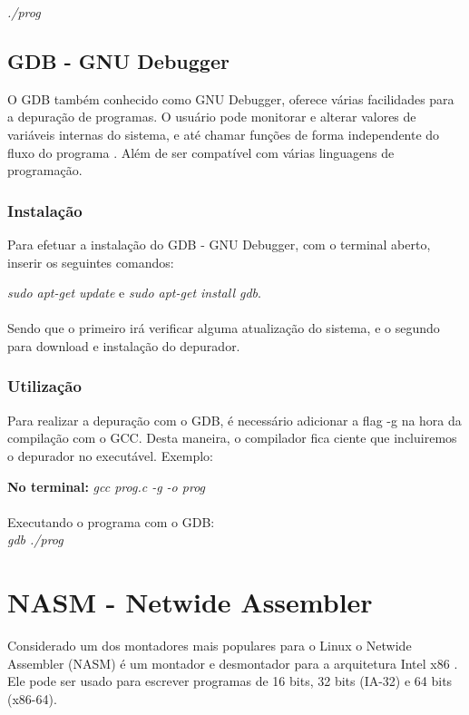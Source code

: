 \documentclass[12pt]{article}
\begin{document}
\textit{./prog}

\subsection{GDB - GNU Debugger}

O GDB também conhecido como GNU Debugger, oferece várias facilidades para a depuração de programas. O usuário pode monitorar e alterar valores de variáveis internas do sistema, e até chamar funções de forma independente do fluxo do programa \cite{stallman1988debugging}. Além de ser compatível com várias linguagens de programação.

\subsubsection{Instalação}

Para efetuar a instalação do GDB - GNU Debugger, com o terminal aberto, inserir os seguintes comandos:

\textit{sudo apt-get update} e \textit{sudo apt-get install gdb}.\\\\ 
Sendo que o primeiro irá verificar alguma atualização do sistema, e o segundo para download e instalação do depurador.

\subsubsection{Utilização}

Para realizar a depuração com o GDB, é necessário adicionar a flag -g na hora da compilação com o GCC. Desta maneira, o compilador fica ciente que incluiremos o depurador no executável. Exemplo:

\textbf{No terminal:}
\textit{gcc prog.c -g -o prog}\\\\
Executando o programa com o GDB:\\

\textit{gdb ./prog}

\section{NASM - Netwide Assembler}

Considerado um dos montadores mais populares para o Linux o Netwide Assembler (NASM) é um montador e desmontador para a arquitetura Intel x86 \cite{tatham2011netwide}. Ele pode ser usado para escrever programas de 16 bits, 32 bits (IA-32) e 64 bits (x86-64).
\end{document}
